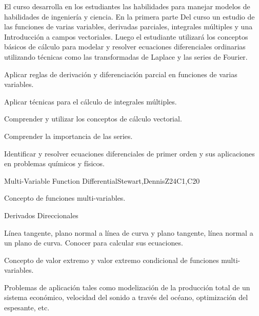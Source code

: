 \begin{syllabus}


\begin{justification}

El curso desarrolla en los estudiantes las habilidades para manejar modelos de habilidades de ingeniería y ciencia. En la primera parte
Del curso un estudio de las funciones de varias variables, derivadas parciales, integrales múltiples y una
Introducción a campos vectoriales. Luego el estudiante utilizará los conceptos básicos de cálculo para modelar y resolver ecuaciones diferenciales ordinarias utilizando técnicas como las transformadas de Laplace y las series de Fourier.

\end{justification}

\begin{goals}
  \item Aplicar reglas de derivación y diferenciación parcial en funciones de varias variables.
  \item Aplicar técnicas para el cálculo de integrales múltiples.
  \item Comprender y utilizar los conceptos de cálculo vectorial.
  \item Comprender la importancia de las series.
  \item Identificar y resolver ecuaciones diferenciales de primer orden y sus aplicaciones en problemas químicos y físicos.
\end{goals}

\begin{outcomes} 
    \item {}  
    \item {}
\end{outcomes}

\begin{competences}  
    \item {}
    \item {}
\end{competences}

\begin{unit}{Multi-Variable Function Differential}{}{Stewart,DennisZ}{24}{C1,C20}
   \begin{topics}      
    \item Concepto de funciones multi-variables.
    \item Derivados Direccionales
    \item Línea tangente, plano normal a línea de curva y plano tangente, línea normal a un plano de curva. Conocer para calcular sus ecuaciones.
    \item Concepto de valor extremo y valor extremo condicional de funciones multi-variables.
    \item Problemas de aplicación tales como modelización de la producción total de un sistema económico, velocidad del sonido a través del océano, optimización del espesante, etc.
      \end{topics}


\end{unit}
\end{syllabus}
